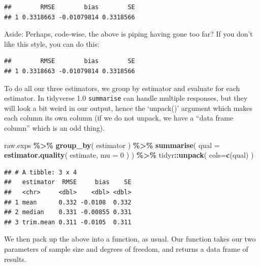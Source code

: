 \documentclass[
]{book}
\newenvironment{Shaded}{\begin{snugshade}}{\end{snugshade}}
\newcommand{\AttributeTok}[1]{\textcolor[rgb]{0.13,0.29,0.53}{#1}}
\newcommand{\DecValTok}[1]{\textcolor[rgb]{0.00,0.00,0.81}{#1}}
\newcommand{\FunctionTok}[1]{\textcolor[rgb]{0.13,0.29,0.53}{\textbf{#1}}}
\newcommand{\NormalTok}[1]{#1}
\newcommand{\SpecialCharTok}[1]{\textcolor[rgb]{0.81,0.36,0.00}{\textbf{#1}}}
\newcommand{\StringTok}[1]{\textcolor[rgb]{0.31,0.60,0.02}{#1}}
\begin{document}
\begin{verbatim}
##        RMSE        bias        SE
## 1 0.3318663 -0.01079814 0.3318566
\end{verbatim}

Aside: Perhaps, code-wise, the above is piping having gone too far? If you don't like this style, you can do
this:

\begin{Shaded}
\end{Shaded}

\begin{verbatim}
##        RMSE        bias        SE
## 1 0.3318663 -0.01079814 0.3318566
\end{verbatim}

To do all our three estimators, we group by estimator and evaluate for each
estimator. In tidyverse 1.0 \texttt{summarise} can handle multiple responses, but they
will look a bit weird in our output, hence the `unpack()' argument which
makes each column its own column (if we do not unpack, we have a ``data frame
column'' which is an odd thing).

\begin{Shaded}
\begin{Highlighting}[]
\NormalTok{raw.exps }\SpecialCharTok{\%\textgreater{}\%}
    \FunctionTok{group\_by}\NormalTok{( estimator ) }\SpecialCharTok{\%\textgreater{}\%}
    \FunctionTok{summarise}\NormalTok{( }\AttributeTok{qual =} \FunctionTok{estimator.quality}\NormalTok{( estimate, }\AttributeTok{mu =} \DecValTok{0}\NormalTok{ ) ) }\SpecialCharTok{\%\textgreater{}\%}
\NormalTok{    tidyr}\SpecialCharTok{::}\FunctionTok{unpack}\NormalTok{( }\AttributeTok{cols=}\FunctionTok{c}\NormalTok{(qual) )}
\end{Highlighting}
\end{Shaded}

\begin{verbatim}
## # A tibble: 3 x 4
##   estimator  RMSE     bias    SE
##   <chr>     <dbl>    <dbl> <dbl>
## 1 mean      0.332 -0.0108  0.332
## 2 median    0.331 -0.00855 0.331
## 3 trim.mean 0.311 -0.0105  0.311
\end{verbatim}

We then pack up the above into a function, as usual.
Our function takes our two parameters of sample size and degrees of freedom, and returns a data frame of results.
\end{document}
